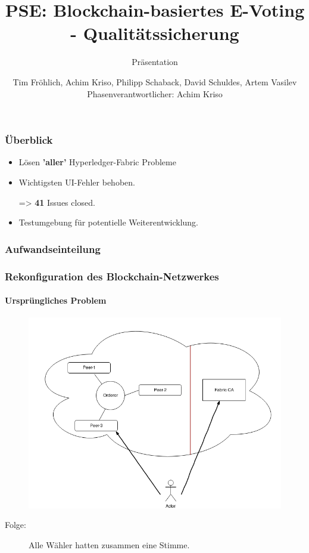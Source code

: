 \documentclass{beamer}
\title[]{PSE: Blockchain-basiertes E-Voting - Qualitätssicherung}
\subtitle{Präsentation}
\author{Tim Fröhlich, Achim Kriso, Philipp Schaback, David Schuldes, Artem Vasilev\\ Phasenverantwortlicher: Achim Kriso}
\institute[]{KARLSRUHER INSTITUT FÜR TECHNOLOGIE (KIT)}
\begin{document}
\begin{frame}
\maketitle
\end{frame}

\begin{frame}
\frametitle{Überblick}
	\begin{itemize}
		\item Lösen \textbf{'aller'} Hyperledger-Fabric Probleme
		\item Wichtigsten UI-Fehler behoben.
		\item[=>] \textbf{41} Issues closed.
		\item Testumgebung für potentielle Weiterentwicklung.
	\end{itemize}
\end{frame}

\begin{frame}
\frametitle{Aufwandseinteilung}
	\begin{figure}
		\centering
	\end{figure}
\end{frame}

\begin{frame}
\frametitle{Rekonfiguration des Blockchain-Netzwerkes}
\framesubtitle{Ursprüngliches Problem}
	\begin{figure}
		\vspace{-5pt}
		\centering
		\includegraphics[width=\textheight]{pictures/wolkendiagramm}
	\end{figure}
	\begin{description}
		\item[Folge:] Alle Wähler hatten zusammen eine Stimme.
	\end{description}
\end{frame}
\end{document}

